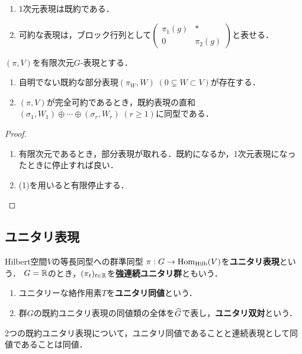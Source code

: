 \documentclass[uplatex,dvipdfmx]{jsreport}
\begin{document}
\begin{example}\mbox{}
    \begin{enumerate}
        \item 1次元表現は既約である．
        \item 可約な表現は，ブロック行列として$\begin{pmatrix}\pi_1(g)&*\\0&\pi_2(g)\end{pmatrix}$と表せる．
    \end{enumerate}
\end{example}

\begin{lemma}
    $(\pi,V)$を有限次元$G$-表現とする．
    \begin{enumerate}
        \item 自明でない既約な部分表現$(\pi_W,W)\;(0\subsetneq W\subset V)$が存在する．
        \item $(\pi,V)$が完全可約であるとき，既約表現の直和$(\sigma_1,W_1)\oplus\cdots\oplus(\sigma_r,W_r)\;(r\ge1)$に同型である．
    \end{enumerate}
\end{lemma}
\begin{proof}\mbox{}
    \begin{enumerate}
        \item 有限次元であるとき，部分表現が取れる．既約になるか，1次元表現になったときに停止すれば良い．
        \item (1)を用いると有限停止する．
    \end{enumerate}
\end{proof}

\subsection{ユニタリ表現}

\begin{definition}
    Hilbert空間$V$の等長同型への群準同型
    $\pi:G\to\mathrm{Hom}_{\mathrm{Hilb}}(V)$を\textbf{ユニタリ表現}という．
    $G=\mathbb{R}$のとき，$(\pi_t)_{t\in\mathbb{R}}$を\textbf{強連続ユニタリ群}ともいう．
\end{definition}

\begin{definition}\mbox{}
    \begin{enumerate}
        \item ユニタリーな絡作用素$T$を\textbf{ユニタリ同値}という．
        \item 群$G$の既約ユニタリ表現の同値類の全体を$\widehat{G}$で表し，\textbf{ユニタリ双対}という．
    \end{enumerate}
\end{definition}
\begin{remark}
    2つの既約ユニタリ表現について，ユニタリ同値であることと連続表現として同値であることは同値．
\end{remark}
\end{document}

